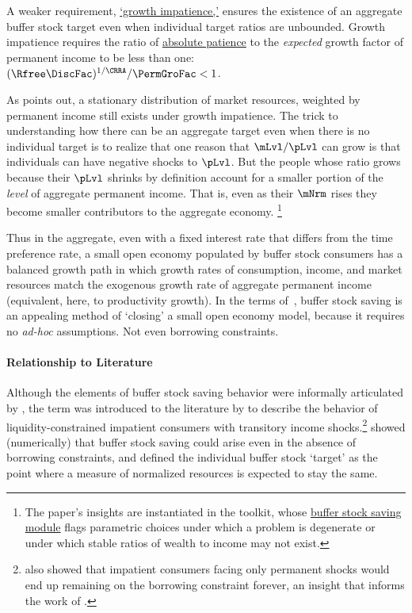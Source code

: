 \documentclass[BufferStockTheory]{subfiles}
\begin{document}
A weaker requirement, \hyperlink{GIC}{`growth impatience,'} ensures the existence of an aggregate buffer stock target even when individual target ratios are unbounded.
Growth impatience requires the ratio of \hyperlink{APFacDefn}{absolute patience} to the \textit{expected} growth factor of permanent income to be less than one: $\APFacRaw/\PermGroFac < 1$.

As \cite{harmenbergInvariant} points out, a stationary distribution of market resources, weighted by permanent income still exists under growth impatience. 
The trick to understanding how there can be an aggregate target even when there is no individual target is to realize that one reason that $\mLvl/\pLvl$ can grow is that individuals can have negative shocks to $\pLvl$.  But the people whose ratio grows because their $\pLvl$ shrinks by definition account for a smaller portion of the \textit{level} of aggregate permanent income. That is, even as their $\mNrm$ rises they become smaller contributors to the aggregate economy.  
\footnote{The paper's insights are instantiated in the {\ARKurl} toolkit, whose \href{https://hark.readthedocs.io/en/stable/reference/ConsumptionSaving/ConsIndShockModel.html}{buffer stock saving module} flags parametric choices under which a problem is degenerate or under which stable ratios of wealth to income may not exist.}

Thus in the aggregate, even with a fixed interest rate that differs from the time preference rate, a small open economy populated by buffer stock consumers has a balanced growth path in which growth rates of consumption, income, and market resources match the exogenous growth rate of aggregate permanent income (equivalent, here, to productivity growth).
In the terms of~\cite{schmitt2003closing}, buffer stock saving is an appealing method of `closing' a small open economy model, because it requires no \textit{ad-hoc} assumptions.
Not even borrowing constraints.


\vspace{-1em}

\hypertarget{cfLiterature}{}
\hypertarget{DiffFromLit}{} 
\paragraph{Relationship to Literature}


Although the elements of buffer stock saving behavior were informally articulated by \cite{friedmanATheory}, the term was introduced to the literature by \cite{deatonLiqConstr} to describe the behavior of liquidity-constrained impatient consumers with transitory income shocks.\footnote{\cite{deatonLiqConstr} also showed that impatient consumers facing only permanent shocks would end up remaining on the borrowing constraint forever, an insight that informs the work of \cite{kvwWealthyH2m}.} \cite{carroll:brookings} showed (numerically) that buffer stock saving could arise even in the absence of borrowing constraints, and defined the individual buffer stock `target' as the point where a measure of normalized resources is expected to stay the same.
\end{document}
